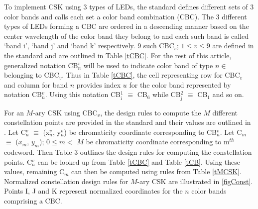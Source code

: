 To implement CSK using 3 types of LEDs, the standard defines different sets of 3 color bands and calls each set a color band combination (CBC). The 3 different types of LEDs forming a CBC are ordered in a descending manner based on the center wavelength of the color band they belong to and each such band is called `band i', `band j' and `band k' respectively. 9 such CBC$_{v}$; $1\leq v\leq 9$ are defined in the standard and are outlined in Table \ref{tCBC}. For the rest of this article, generalized notation CB$^{v}_{n}$ will be used to indicate color band of type $n\in$  belonging to CBC$_{v}$. Thus in Table \ref{tCBC}, the cell representing row for CBC$_{v}$ and column for band $n$ provides index $u$ for the color band represented by notation CB$^{v}_{n}$. Using this notation CB$^{1}_{\text{i}}$ $\equiv$ CB$_{6}$ while CB$^{2}_{\text{j}}$ $\equiv$ CB$_{1}$ and so on.

For an $M$-ary CSK using CBC$_{v}$, the design rules to compute the $M$ different constellation points are provided in the standard and their values are outlined in \cite{cskxy}. Let C$^{v}_{n}$ $\equiv$ (x$^{v}_{n}$, y$^{v}_{n}$) be chromaticity coordinate corresponding to CB$^{v}_{n}$. Let C$_{m}$ $\equiv$ ($x_{m}$, $y_{m}$); $0\leq m <$ $M$ be chromaticity coordinate corresponding to m$^{th}$ codeword. Then Table 3 outlines the design rules for computing the constellation points. C$^{v}_{n}$ can be looked up from Table \ref{tCBC} and Table \ref{tCB}. Using these values, remaining C$_{m}$ can then be computed using rules from Table \ref{tMCSK}. Normalized constellation design rules for $M$-ary CSK are illustrated in \figurename{ }\ref{figConst}. Points I, J and K represent normalized coordinates for the $n$ color bands comprising a CBC. 


